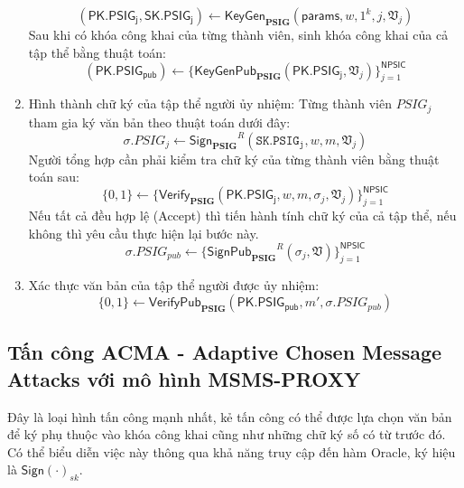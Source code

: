 \begin{defi}
\begin{enumerate}[label=(\arabic*)]
\begin{equation}
	\mathsf{(PK.PSIG_j,SK.PSIG_j)} \gets \boldsymbol{\mathsf{KeyGen}_{PSIG}}(\mathsf{params},w, 1^k, j, \mathfrak{V}_j)
	\end{equation}
	Sau khi có khóa công khai của từng thành viên, sinh khóa công khai của cả tập thể bằng thuật toán:
	\begin{equation}
	\mathsf{(PK.PSIG_{pub})} \gets \{\boldsymbol{\mathsf{KeyGenPub}_{PSIG}}(\mathsf{PK.PSIG_j},\mathfrak{V}_j)\}^{\mathsf{NPSIC}}_{j=1}
	\end{equation}	
	\item Hình thành chữ ký của tập thể người ủy nhiệm: Từng thành viên $PSIG_j$ tham gia ký văn bản theo thuật toán dưới đây:
	\begin{equation}
	\sigma.PSIG_j \gets \boldsymbol{\mathsf{Sign}_{PSIG}}^R(\mathtt{SK.PSIG_j},w,m,\mathfrak{V}_j)
	\end{equation}
	Người tổng hợp cần phải kiểm tra chữ ký của từng thành viên bằng thuật toán sau:
	\begin{equation}
	\{0,1\} \gets \{\boldsymbol{\mathsf{Verify}_{PSIG}}(\mathsf{PK.PSIG_{j}},w,m,\sigma_{j},\mathfrak{V}_j)\}^{\mathsf{NPSIC}}_{j=1} 
	\end{equation}
	Nếu tất cả đều hợp lệ (Accept) thì tiến hành tính chữ ký của cả tập thể, nếu không thì yêu cầu thực hiện lại bước này.
	\begin{equation}
	\sigma.PSIG_{pub} \gets \{\boldsymbol{\mathsf{SignPub}_{PSIG}}^R(\sigma_j,\mathfrak{V})\}^{\mathsf{NPSIC}}_{j=1}
	\end{equation}
	\item Xác thực văn bản của tập thể người được ủy nhiệm:
	\begin{equation}
	\{0,1\} \gets \boldsymbol{\mathsf{VerifyPub}_{PSIG}}(\mathsf{PK.PSIG_{pub}},m',\sigma.PSIG_{pub})  
	\end{equation}
\end{enumerate}
\end{defi}


\subsection{Tấn công ACMA - Adaptive Chosen Message Attacks với mô hình MSMS-PROXY}

Đây là loại hình tấn công mạnh nhất, kẻ tấn công có thể được lựa chọn văn bản để ký phụ thuộc vào khóa công khai cũng như những chữ ký số có từ trước đó. Có thể biểu diễn việc này thông qua khả năng truy cập đến hàm Oracle, ký hiệu là $\mathsf{Sign(\cdot)}_{sk}$.

